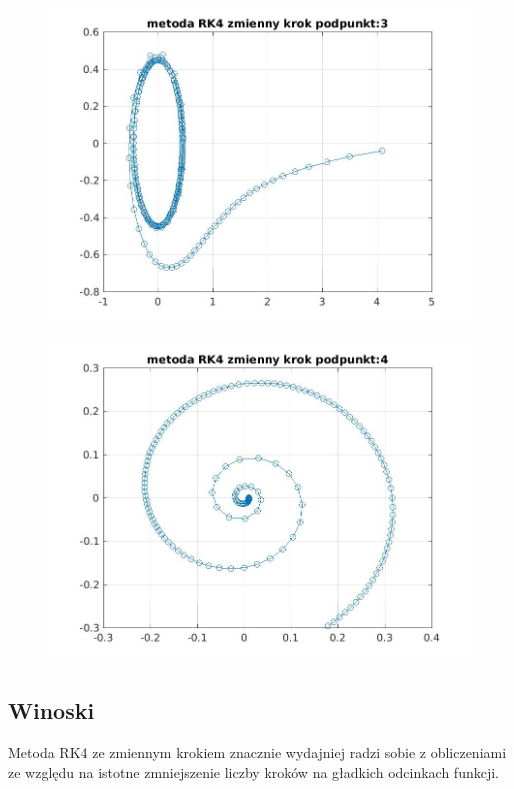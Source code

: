 \documentclass[a4paper, 12pt]{article}
\begin{document}
\begin{figure}[H]
\centering
\includegraphics[width = 15cm]{2d/metoda RK4 zmienny krok podpunkt:3.jpg}
\end{figure}
\begin{figure}[H]
\centering
\includegraphics[width = 15cm]{2d/metoda RK4 zmienny krok podpunkt:4.jpg}
\end{figure}

\subsection{Winoski}
Metoda RK4 ze zmiennym krokiem znacznie wydajniej radzi sobie z obliczeniami ze względu na istotne zmniejszenie liczby kroków na gładkich odcinkach funkcji. 
\end{document}
